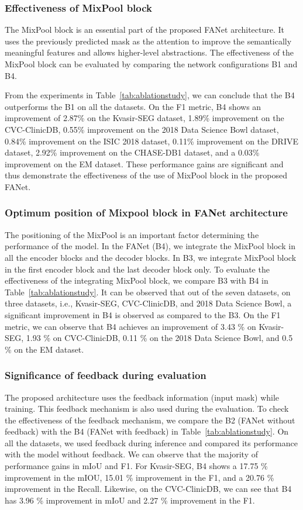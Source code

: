 \documentclass[journal]{IEEEtran}
\begin{document}
\subsubsection{Effectiveness of MixPool block}
The MixPool block is an essential part of the proposed FANet architecture. It uses the previously predicted mask as the attention to improve the semantically meaningful features and allows higher-level abstractions.  The effectiveness of the MixPool block can be evaluated by comparing the network configurations B1 and B4.

From the experiments in Table~\ref{tab:ablationstudy}, we can conclude that the B4 outperforms the B1 on all the datasets. On the F1 metric, B4 shows an improvement of 2.87\% on the Kvasir-SEG dataset, 1.89\% improvement on the CVC-ClinicDB, 0.55\% improvement on the 2018 Data Science Bowl dataset, 0.84\% improvement on the ISIC 2018 dataset, 0.11\% improvement on the DRIVE dataset, 2.92\% improvement on the CHASE-DB1 dataset, and a 0.03\% improvement on the EM dataset. These performance gains are significant and thus demonstrate the effectiveness of the use of MixPool block in the proposed FANet. 
\subsubsection{Optimum position of Mixpool block in FANet architecture}
The positioning of the MixPool is an important factor determining the performance of the model. In the FANet (B4), we integrate the MixPool block in all the encoder blocks and the decoder blocks. In B3, we integrate MixPool block in the first encoder block and the last decoder block only. To evaluate the effectiveness of the integrating MixPool block, we compare B3 with B4 in Table~\ref{tab:ablationstudy}. It can be observed that out of the seven datasets, on three datasets, i.e., Kvasir-SEG, CVC-ClinicDB, and 2018 Data Science Bowl, a  significant improvement in B4 is observed as compared to the B3. On the F1 metric, we can observe that B4 achieves an improvement of 3.43 \% on Kvasir-SEG, 1.93 \% on CVC-ClinicDB, 0.11 \% on the 2018 Data Science Bowl, and 0.5 \% on the EM dataset. 
\subsubsection{Significance of feedback during evaluation}
The proposed architecture uses the feedback information (input mask) while training. This feedback mechanism is also used during the evaluation. To check the effectiveness of the feedback mechanism, we compare the B2 (FANet without feedback) with the B4 (FANet with feedback) in Table~\ref{tab:ablationstudy}. On all the datasets, we used feedback during inference and compared its performance with the model without feedback. We can observe that the majority of performance gains in \ac{mIoU} and F1. For Kvasir-SEG,  B4 shows a 17.75 \% improvement in the  mIOU, 15.01 \% improvement in the F1, and a 20.76 \% improvement in the Recall. Likewise, on the CVC-ClinicDB, we can see that B4 has 3.96 \% improvement in  \ac{mIoU} and 2.27 \% improvement in the F1.
\end{document}
